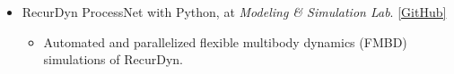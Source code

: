 \documentclass[a4paper,10pt]{extarticle}
\begin{document}
\begin{itemize}

	\item RecurDyn ProcessNet with Python, at \textit{Modeling \& Simulation Lab}. \href{https://github.com/leehyeonbeen/RecurDynPython}{\color{blue}[GitHub]}

	      {\small
		      \vspace*{-0.2cm}
		      \begin{itemize}
			      \item Automated and parallelized flexible multibody dynamics (FMBD) simulations of RecurDyn.
		      \end{itemize}
		      \vspace*{-0.2cm}
	      }
\end{itemize}


\end{document}
